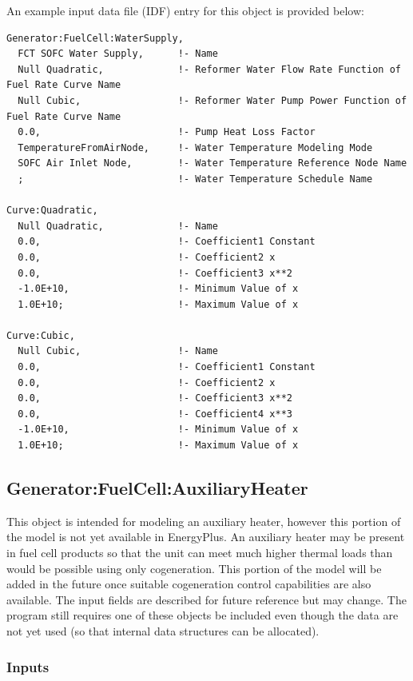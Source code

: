An example input data file (IDF) entry for this object is provided below:

\begin{lstlisting}
Generator:FuelCell:WaterSupply,
  FCT SOFC Water Supply,      !- Name
  Null Quadratic,             !- Reformer Water Flow Rate Function of Fuel Rate Curve Name
  Null Cubic,                 !- Reformer Water Pump Power Function of Fuel Rate Curve Name
  0.0,                        !- Pump Heat Loss Factor
  TemperatureFromAirNode,     !- Water Temperature Modeling Mode
  SOFC Air Inlet Node,        !- Water Temperature Reference Node Name
  ;                           !- Water Temperature Schedule Name

Curve:Quadratic,
  Null Quadratic,             !- Name
  0.0,                        !- Coefficient1 Constant
  0.0,                        !- Coefficient2 x
  0.0,                        !- Coefficient3 x**2
  -1.0E+10,                   !- Minimum Value of x
  1.0E+10;                    !- Maximum Value of x

Curve:Cubic,
  Null Cubic,                 !- Name
  0.0,                        !- Coefficient1 Constant
  0.0,                        !- Coefficient2 x
  0.0,                        !- Coefficient3 x**2
  0.0,                        !- Coefficient4 x**3
  -1.0E+10,                   !- Minimum Value of x
  1.0E+10;                    !- Maximum Value of x
\end{lstlisting}

\subsection{Generator:FuelCell:AuxiliaryHeater}\label{generatorfuelcellauxiliaryheater}

This object is intended for modeling an auxiliary heater, however this portion of the model is not yet available in EnergyPlus. An auxiliary heater may be present in fuel cell products so that the unit can meet much higher thermal loads than would be possible using only cogeneration. This portion of the model will be added in the future once suitable cogeneration control capabilities are also available. The input fields are described for future reference but may change. The program still requires one of these objects be included even though the data are not yet used (so that internal data structures can be allocated).

\subsubsection{Inputs}\label{inputs-16-002}

